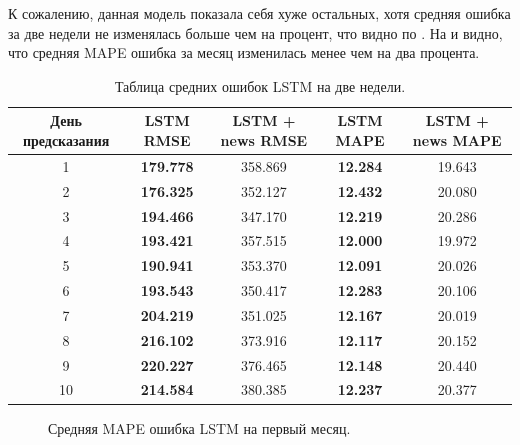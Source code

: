\documentclass[12pt, a4paper]{article}
\begin{document}
К сожалению, данная модель показала себя хуже остальных, хотя средняя ошибка за две недели не изменялась больше чем на процент, что видно по . На  и  видно, что средняя MAPE ошибка за месяц изменилась менее чем на два процента.
\begin{table}[h!]
\centering
\caption{Таблица средних ошибок LSTM на две недели.}
\begin{tabular}{ |c|c|c|c|c| } 
 \hline
 День предсказания & LSTM RMSE & LSTM + news RMSE & LSTM MAPE & LSTM + news MAPE \\ 
 \hline
1 & \textbf{179.778} & 358.869 & \textbf{12.284} & 19.643 \\ 
 \hline
2 & \textbf{176.325} & 352.127 & \textbf{12.432} & 20.080 \\ 
 \hline
3 & \textbf{194.466} & 347.170 & \textbf{12.219} & 20.286 \\ 
 \hline
4 & \textbf{193.421} & 357.515 & \textbf{12.000} & 19.972 \\ 
 \hline
5 & \textbf{190.941} & 353.370 & \textbf{12.091} & 20.026 \\ 
 \hline
6 & \textbf{193.543} & 350.417 & \textbf{12.283} & 20.106 \\ 
 \hline
7 & \textbf{204.219} & 351.025 & \textbf{12.167} & 20.019 \\ 
 \hline
8 & \textbf{216.102} & 373.916 & \textbf{12.117} & 20.152 \\ 
 \hline
9 & \textbf{220.227} & 376.465 & \textbf{12.148} & 20.440 \\ 
 \hline
10 & \textbf{214.584} & 380.385 & \textbf{12.237} & 20.377 \\ 
 \hline
\end{tabular}
\label{tab:lstm}
\end{table}
\begin{figure}[!h]
\caption{Средняя MAPE ошибка LSTM на первый месяц.}
\label{fig:lstm}
\end{figure}
\end{document}
